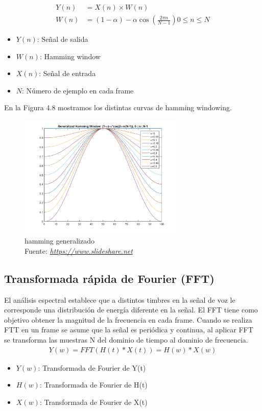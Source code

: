 	\begin{equation}
	\label{STs3}
	\begin{aligned}
	Y(n)&= X(n) \times W(n)\\
	W(n)&=(1-\alpha)-\alpha\cos(\frac{2\pi n}{N-1})    0\leq n\leq N
	\end{aligned}
	\end{equation}
	\begin{itemize}
		\item $Y(n)$: Señal de salida
		\item $W(n)$: Hamming window
		\item $X(n)$: Señal de entrada
		\item $N$: Número de ejemplo en cada frame
	\end{itemize}
	En la Figura 4.8 mostramos los distintas curvas de hamming windowing.
		 \begin{figure}[H]
		\centering
		\includegraphics[width=0.7\textwidth]{Figures/hamming.png}
		\caption{hamming generalizado \\ Fuente:  \href{https://www.slideshare.net/niranjankumar47/final-project-new-49797350}{\textit{https://www.slideshare.net}}}
		\label{ondaSSs}
		
	\end{figure}
	\subsection{Transformada rápida de Fourier (FFT)} 
	El análisis espectral establece que a distintos timbres en la señal de voz le corresponde una distribución de energía diferente en la señal. El FFT tiene como objetivo obtener la magnitud de la frecuencia en cada frame. Cuando se realiza FTT en un frame se asume que la señal es periódica y continua, al aplicar FFT se transforma las muestras N del dominio de tiempo al dominio de frecuencia.
	\begin{equation}
		\label{TFF}
		\begin{aligned}
		Y(w)= FFT(H(t)\ast X(t))= H(w) \ast X(w)
		\end{aligned}
	\end{equation}
		\begin{itemize}
			\item $Y(w)$: Transformada de Fourier de Y(t)
			\item $H(w)$: Transformada de Fourier de H(t)
			\item $X(w)$: Transformada de Fourier de X(t)

		\end{itemize}
	
